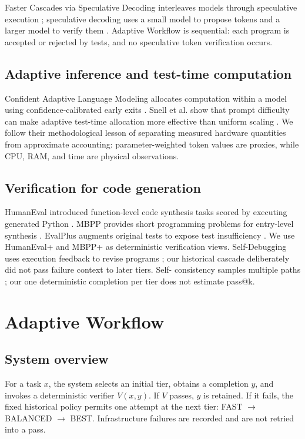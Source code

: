 \documentclass[10pt]{article}
\begin{document}
Faster Cascades via Speculative Decoding interleaves models through speculative
execution \cite{narasimhan2025cascades}; speculative decoding uses a small
model to propose tokens and a larger model to verify them
\cite{leviathan2023speculative}. Adaptive Workflow is sequential: each program
is accepted or rejected by tests, and no speculative token verification occurs.

\subsection{Adaptive inference and test-time computation}
Confident Adaptive Language Modeling allocates computation within a model using
confidence-calibrated early exits \cite{schuster2022calm}. Snell et al. show
that prompt difficulty can make adaptive test-time allocation more effective
than uniform scaling \cite{snell2024testtime}. We follow their methodological
lesson of separating measured hardware quantities from approximate accounting:
parameter-weighted token values are proxies, while CPU, RAM, and time are
physical observations.

\subsection{Verification for code generation}
HumanEval introduced function-level code synthesis tasks scored by executing
generated Python \cite{chen2021humaneval}. MBPP provides short programming
problems for entry-level synthesis \cite{austin2021mbpp}. EvalPlus augments
original tests to expose test insufficiency \cite{liu2023evalplus}. We use
HumanEval+ and MBPP+ as deterministic verification views. Self-Debugging uses
execution feedback to revise programs \cite{chen2023selfdebug}; our historical
cascade deliberately did not pass failure context to later tiers. Self-
consistency samples multiple paths \cite{wang2023selfconsistency}; our one
deterministic completion per tier does not estimate pass@k.

\section{Adaptive Workflow}
\subsection{System overview}
For a task $x$, the system selects an initial tier, obtains a completion $y$,
and invokes a deterministic verifier $V(x,y)$. If $V$ passes, $y$ is retained.
If it fails, the fixed historical policy permits one attempt at the next tier:
FAST $\rightarrow$ BALANCED $\rightarrow$ BEST. Infrastructure failures are
recorded and are not retried into a pass.
\end{document}
